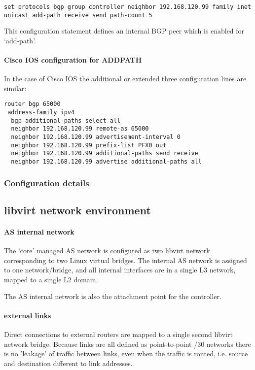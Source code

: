 \begin{verbatim}
set protocols bgp group controller neighbor 192.168.120.99 family inet unicast add-path receive send path-count 5
\end{verbatim}
This configuration statement defines an internal BGP peer which is enabled for `add-path'.

\paragraph{Cisco IOS configuration for ADDPATH}

In the case of Cisco IOS the additional or extended three configuration lines are similar:
\begin{verbatim}
router bgp 65000
 address-family ipv4
  bgp additional-paths select all
  neighbor 192.168.120.99 remote-as 65000
  neighbor 192.168.120.99 advertisement-interval 0
  neighbor 192.168.120.99 prefix-list PFX0 out
  neighbor 192.168.120.99 additional-paths send receive
  neighbor 192.168.120.99 advertise additional-paths all
\end{verbatim}

\subsubsection{Configuration details}


\subsection{libvirt network environment}

\paragraph{AS internal network}
The 'core' managed AS network is configured as two libvirt network corresponding to two Linux virtual bridges.
The internal AS network is assigned to one network/bridge, and all internal interfaces are in a single L3 network, mapped to a single L2 domain.

The AS internal network is also the attachment point for the \hbgp controller.

\paragraph{external links}
Direct connections to external routers are mapped to a single second libvirt network bridge.  Because links are all defined as point-to-point /30 networks there is no 'leakage' of traffic between links, even when the traffic is routed, i.e. source and destination different to link addresses.

